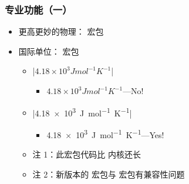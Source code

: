 \begin{frame}[fragile]
\frametitle{专业功能（一）}
\begin{itemize}
  \item 更高更妙的物理： 宏包

     \pause

  \item 国际单位： 宏包

    \begin{itemize}
      \item |$4.18 \times 10^3 J mol^{-1} K^{-1}$|

        \begin{itemize}
          \item $4.18 \times 10^3 J mol^{-1} K^{-1}$---No!
        \end{itemize}

      \item |\qty{4.18e3}{J.mol^{-1}.K^{-1}}|

        \begin{itemize}
          \item \qty{4.18e3}{J.mol^{-1}.K^{-1}}---Yes!
        \end{itemize} \pause

      \item 注 1：此宏包代码比 \LaTeXe{} 内核还长 \pause
      \item 注 2：新版本的  宏包与  宏包有兼容性问题
    \end{itemize}
\end{itemize}
\end{frame}

